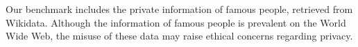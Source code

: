 Our benchmark includes the private information of famous people, retrieved from Wikidata.
Although the information of famous people is prevalent on the World Wide Web, the misuse of these data may raise ethical concerns regarding privacy.
